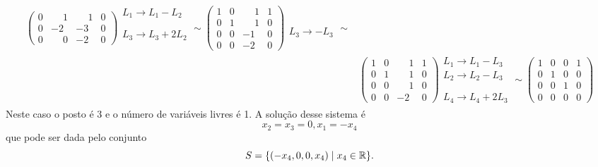 \begin{exemplo}
\begin{solucao}
\begin{enumerate}
\begin{align*}
\begin{pmatrix}
                    0 &\phantom{-} 1 &\phantom{-} 1 & 0\\
                    0 & -2 & -3 & 0\\
                    0 &\phantom{-} 0 & -2 & 0
                \end{pmatrix}
                \begin{array}{l}
                    L_1 \to L_1 - L_2\\\phantom{x}\\L_3 \to L_3 + 2L_2\\\phantom{x}
                \end{array}\sim
                \begin{pmatrix}
                    1 & 0 &\phantom{-} 1 & 1\\
                    0 & 1 &\phantom{-} 1 & 0\\
                    0 & 0 & -1 & 0\\
                    0 & 0 & -2 & 0
                \end{pmatrix}
                \begin{array}{l}
                    \phantom{x}\\\phantom{x}\\L_3 \to -L_3\\\phantom{x}
                \end{array}\sim\\
                &\begin{pmatrix}
                    1 & 0 &\phantom{-} 1 & 1\\
                    0 & 1 &\phantom{-} 1 & 0\\
                    0 & 0 &\phantom{-} 1 & 0\\
                    0 & 0 & -2 & 0
                \end{pmatrix}
                \begin{array}{l}
                    L_1 \to L_1 - L_3\\L_2 \to L_2 - L_3\\\phantom{x}\\L_4 \to L_4 + 2L_3
                \end{array}\sim
                \begin{pmatrix}
                    1 & 0 & 0 & 1\\
                    0 & 1 & 0 & 0\\
                    0 & 0 & 1 & 0\\
                    0 & 0 & 0 & 0
                \end{pmatrix}
            \end{align*}
            Neste caso o posto \'e 3 e o n\'umero de vari\'aveis livres \'e 1. A solu\c{c}\~ao desse sistema \'e
            \[
                x_2 = x_3 = 0, x_1 = -x_4
            \]
            que pode ser dada pelo conjunto
            \[
                S = \{(-x_4, 0, 0, x_4) \mid x_4 \in \mathbb{R}\}.
            \]

    \end{enumerate}
\end{solucao}
\end{exemplo}
